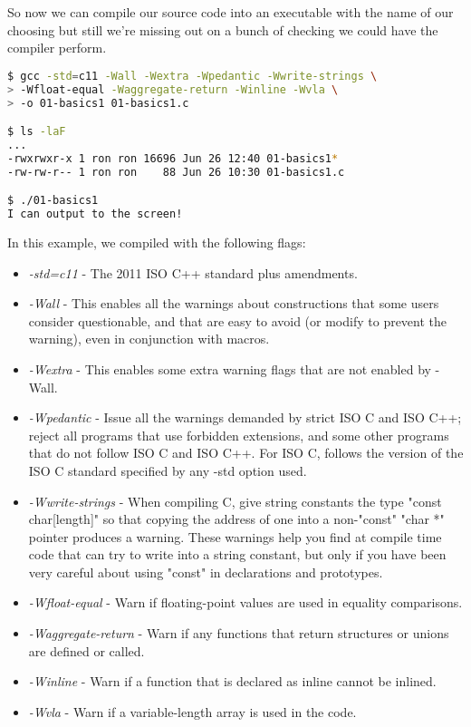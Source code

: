 \documentclass[../main.tex]{subfiles}
\begin{document}
So now we can compile our source code into an executable with the name of our choosing but still we're missing out on a bunch of checking we could have the compiler perform.\\

\begin{lstlisting}[language=bash, numbers=none]
$ gcc -std=c11 -Wall -Wextra -Wpedantic -Wwrite-strings \
> -Wfloat-equal -Waggregate-return -Winline -Wvla \
> -o 01-basics1 01-basics1.c

$ ls -laF
...
-rwxrwxr-x 1 ron ron 16696 Jun 26 12:40 01-basics1*
-rw-rw-r-- 1 ron ron    88 Jun 26 10:30 01-basics1.c

$ ./01-basics1 
I can output to the screen!
\end{lstlisting}

In this example, we compiled with the following flags:
\begin{itemize}
	\item \textit{-std=c11} - The 2011 ISO C++ standard plus amendments.
	\item \textit{-Wall} - This enables all the warnings about constructions that some users consider questionable, and that are easy to avoid (or modify to prevent the warning), even in conjunction with macros.
	\item \textit{-Wextra} - This enables some extra warning flags that are not enabled by -Wall.
	\item \textit{-Wpedantic} - Issue all the warnings demanded by strict ISO C and ISO C++; reject all programs that use forbidden extensions, and some other programs that do not follow ISO C and ISO C++.  For ISO C, follows the version of the ISO C standard specified by any -std option used.
	\item \textit{-Wwrite-strings} - When compiling C, give string constants the type "const char[length]" so that copying the address of one into a non-"const" "char *" pointer produces a warning.  These warnings help you find at compile time code that can try to write into a string constant, but only if you have been very careful about using "const" in declarations and prototypes.
	\item \textit{-Wfloat-equal} - Warn if floating-point values are used in equality comparisons.
	\item \textit{-Waggregate-return} - Warn if any functions that return structures or unions are defined or called.
	\item \textit{-Winline} - Warn if a function that is declared as inline cannot be inlined.
	\item \textit{-Wvla} - Warn if a variable-length array is used in the code.
\end{itemize}
\end{document}
